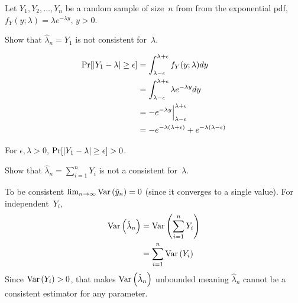 \begin{problem}
   Let ${Y_1,Y_2,\ldots,Y_n}$ be a random sample of size~$n$ from from the exponential pdf, ${f_Y(y;\lambda) = \lambda e^{-\lambda y} \text{, } y > 0}$.
\end{problem}

\begin{subproblem}
  Show that ${\hat{\lambda}_n = Y_1}$ is not consistent for~$\lambda$.
\end{subproblem}




\begin{align}
  \Pr\lbrack\lvert Y_1 - \lambda\rvert \geq \epsilon\rbrack &= \int_{\lambda -\epsilon}^{\lambda + \epsilon} f_{Y}(y;\lambda) dy \\
                                                &= \int_{\lambda -\epsilon}^{\lambda + \epsilon} \lambda e^{-\lambda y} dy \\
                                                &= -e^{-\lambda y} \Big\vert_{\lambda -\epsilon}^{\lambda + \epsilon} \\
                                                &= -e^{-\lambda (\lambda + \epsilon)}  + e^{-\lambda (\lambda - \epsilon)}
\end{align}

For ${\epsilon,\lambda >0}$, ${\Pr\lbrack\lvert Y_1 - \lambda\rvert \geq \epsilon\rbrack > 0}$.

\begin{subproblem}
  Show that ${\hat{\lambda}_n = \sum_{i=1}^{n} Y_i}$ is not a consistent for~$\lambda$.
\end{subproblem}

To be consistent ${\lim_{n \rightarrow \infty} \text{Var}\left(\hat{y}_n\right) = 0}$ (since it converges to a single value). For independent~$Y_i$,
\begin{align}
  \text{Var}\left(\hat{\lambda}_n\right) &= \text{Var}\left(\sum_{i=1}^{n} Y_i\right) \\
                        &= \sum_{i=1}^{n} \text{Var}\left(Y_i\right)
\end{align}
Since ${\text{Var}\left(Y_i\right)>0}$, that makes $\text{Var}\left(\hat{\lambda}_n\right)$ unbounded meaning $\hat{\lambda}_{n}$ cannot be a consistent estimator for any parameter.
